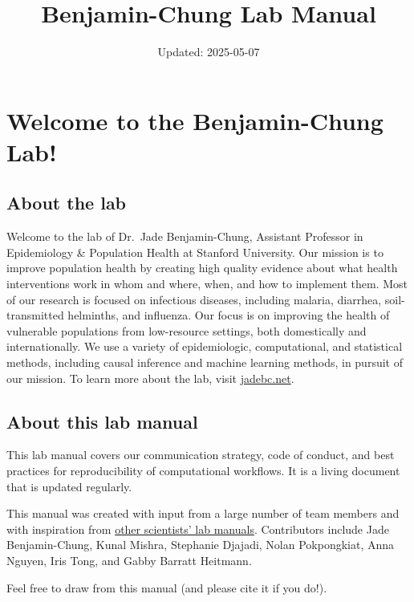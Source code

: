 \documentclass[
]{book}
\title{Benjamin-Chung Lab Manual}
\author{}
\date{\vspace{-2.5em}Updated: 2025-05-07}
\begin{document}
\maketitle

{
\setcounter{tocdepth}{1}
\tableofcontents
}
\chapter{Welcome to the Benjamin-Chung Lab!}\label{welcome-to-the-benjamin-chung-lab}

\section{About the lab}\label{about-the-lab}

Welcome to the lab of Dr.~Jade Benjamin-Chung, Assistant Professor in Epidemiology \& Population Health at Stanford University. Our mission is to improve population health by creating high quality evidence about what health interventions work in whom and where, when, and how to implement them. Most of our research is focused on infectious diseases, including malaria, diarrhea, soil-transmitted helminths, and influenza. Our focus is on improving the health of vulnerable populations from low-resource settings, both domestically and internationally. We use a variety of epidemiologic, computational, and statistical methods, including causal inference and machine learning methods, in pursuit of our mission. To learn more about the lab, visit \href{https://jadebc.net}{jadebc.net}.

\section{About this lab manual}\label{about-this-lab-manual}

This lab manual covers our communication strategy, code of conduct, and best practices for reproducibility of computational workflows. It is a living document that is updated regularly.

This manual was created with input from a large number of team members and with inspiration from \href{https://github.com/alylab/labmanual/blob/master/aly-lab-manual.pdf}{other scientists' lab manuals}.
Contributors include Jade Benjamin-Chung, Kunal Mishra, Stephanie Djajadi, Nolan Pokpongkiat, Anna Nguyen, Iris Tong, and Gabby Barratt Heitmann.

Feel free to draw from this manual (and please cite it if you do!).
\end{document}
